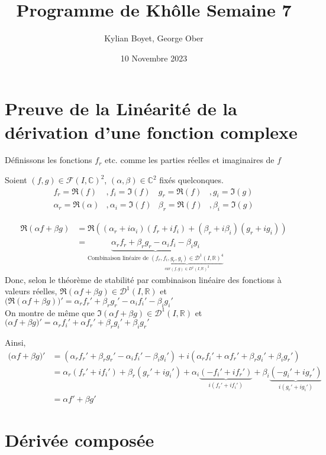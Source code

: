 \documentclass[french]{article}
\title{Programme de Khôlle Semaine 7}
\author{Kylian Boyet, George Ober}
\date{10 Novembre 2023}
\begin{document}
\maketitle
\section{Preuve de la Linéarité de la dérivation d'une fonction complexe}

Définissons les fonctions $f_r$ etc. comme les parties réelles et imaginaires de $f$ 

Soient $(f, g) \in \mathcal{F}(I, \mathbb C)^2$, $(\alpha, \beta) \in \mathbb C^2$ fixés quelconques.
\begin{align*}
	f_r = \Re(f) &, f_i = \Im(f) &g_r = \Re(f) &, g_i = \Im(g)\\
	\alpha_r = \Re(\alpha) &, \alpha_i = \Im(f) &\beta_r = \Re(f) &, \beta_i = \Im(g)
\end{align*}

\begin{align*}
	\Re( \alpha f + \beta g) &= \Re((\alpha_r + i \alpha_i)(f_r + i f_i) + (\beta_r+ i\beta_i)(g_r+ i g_i)) \\
	&= \underbrace{\alpha_r f_r + \beta_r g_r - \alpha_i f_i - \beta_i g_i}_{\text{Combinaison linéaire de } \underbrace{(f_r, f_i, g_r, g_i) \in \mathcal D^1(I, \mathbb R)^4}_{car (f,g) \in D^1(I, \mathbb R)^2}}
\end{align*}
Donc, selon le théorème de stabilité par combinaison linéaire des fonctions à valeurs réelles, $\Re(\alpha f + \beta g) \in \mathcal D^1(I, \mathbb R)$ et $\big(\Re(\alpha f + \beta g)\big)' = \alpha_r f_r' + \beta_r g_r' - \alpha_i f_i' - \beta_i g_i'$
\\
On montre de même que $\Im(\alpha f + \beta g) \in \mathcal D^1(I, \mathbb R)$ et $\big(\alpha f + \beta g\big)' = \alpha_r f_i' +\alpha f_r' +\beta_r g_i' +\beta_i g_r'$

Ainsi,
\begin{align*}
	\big( \alpha f + \beta g \big)' &= (\alpha_r f_r' + \beta_r g_r' - \alpha_i f_i' - \beta_i g_i') + i (\alpha_r f_i' +\alpha f_r' +\beta_r g_i' +\beta_i g_r') \\
	&= \alpha_r(f_r' + if_i') + \beta_r(g_r' + ig_i') + \alpha_i \underbrace{(-f_i' + if_r')}_{i(f_r' + if_i')} + \beta_i \underbrace{( -g_i' + ig_r')}_{i(g_r' + ig_i')} \\
	&=\alpha f' + \beta g'
\end{align*}

\section{Dérivée composée}
\end{document}
